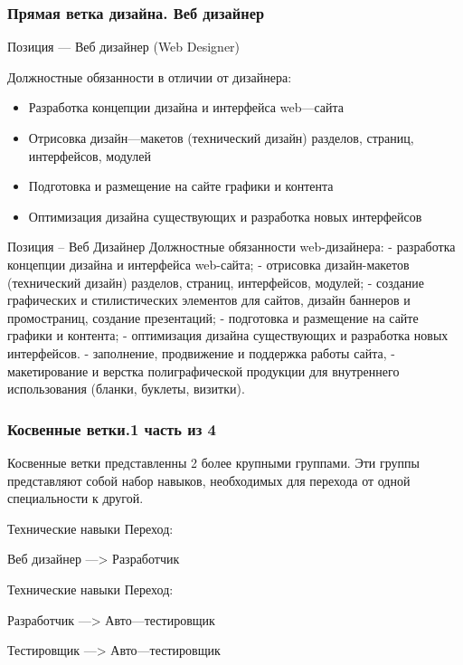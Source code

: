 \documentclass{../industrial-development}
\begin{document}
\begin{frame} \frametitle{Прямая ветка дизайна. Веб дизайнер }
 \begin{block}{}
  \alert{Позиция --- Веб дизайнер (Web Designer)}

Должностные обязанности в отличии от дизайнера: 
  \end{block}
  \begin{itemize}
  \item   Разработка концепции дизайна и интерфейса web---сайта
  \item  Отрисовка дизайн---макетов (технический дизайн) разделов, страниц, интерфейсов, модулей
  \item Подготовка и размещение на сайте графики и контента
 \item Оптимизация дизайна существующих и разработка новых интерфейсов
  \end{itemize}
\end{frame}

\lecturenotes
Позиция – Веб Дизайнер
Должностные обязанности web-дизайнера:
- разработка концепции дизайна и интерфейса web-сайта;
- отрисовка дизайн-макетов (технический дизайн) разделов, страниц, интерфейсов, модулей;
- создание графических и стилистических элементов для сайтов, дизайн баннеров и промостраниц, создание презентаций;
- подготовка и размещение на сайте графики и контента;
- оптимизация дизайна существующих и разработка новых интерфейсов.
- заполнение, продвижение и поддержка работы сайта,
- макетирование и верстка полиграфической продукции для внутреннего использования (бланки, буклеты, визитки).

\begin{frame} \frametitle{Косвенные ветки.1 часть из 4}
 \begin{block}{}
Косвенные ветки представленны 2 более крупными группами. Эти группы представляют собой набор навыков, необходимых для перехода от одной специальности к другой.
  \end{block}
  
\begin{block}{}
 \alert{Технические навыки} Переход: 

Веб дизайнер ---> Разработчик
  \end{block}

 \begin{block}{}
 \alert{Технические навыки} Переход: 

 Разработчик ---> Авто---тестировщик 

 Тестировщик --->  Авто---тестировщик
  \end{block}
\end{frame}
\end{document}
